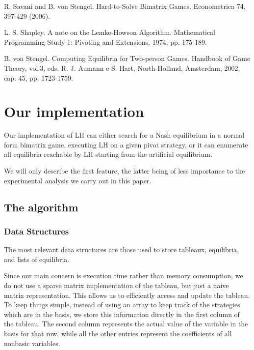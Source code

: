 \documentclass[11pt]{article}
\begin{document}
{\begin{thebibliography}{99}
R. Savani and B. von Stengel. Hard-to-Solve Bimatrix Games.
Econometrica 74, 397-429 (2006).

L. S. Shapley. A note on the Lemke-Howson Algorithm.
Mathematical Programming Study 1: Pivoting and Extensions, 1974, pp. 175-189.

B. von Stengel.
Computing Equilibria for Two-person Games.
Handbook of Game Theory, vol.3, eds. R. J. Aumann e S. Hart, North-Holland,
Amsterdam, 2002, cap. 45, pp. 1723-1759.





\end{thebibliography}}
\newpage

\appendix

\section{Our implementation}

Our implementation of LH can either search for a Nash equilibrium in a normal
form bimatrix game, executing LH on a given pivot strategy, or it
can enumerate all equilibria reachable by LH starting from the
artificial equilibrium.

We will only describe the first feature, the latter being of less
importance to the experimental analysis we carry out in this paper.

\subsection{The algorithm}

\subsubsection{Data Structures}

The most relevant data structures are those used to store tableaux,
equilibria, and lists of equilibria.

Since our main concern is execution time rather than memory
consumption, we do not use a sparse matrix implementation of the
tableau, but just a naive matrix representation. This allows us to
efficiently access and update the tableau. To keep things simple,
instead of using an array to keep track of the strategies which are
in the basis, we store this information directly in the first column
of the tableau. The second column represents the actual value of the
variable in the basis for that row, while all the other entries
represent the coefficients of all nonbasic variables.
\end{document}
